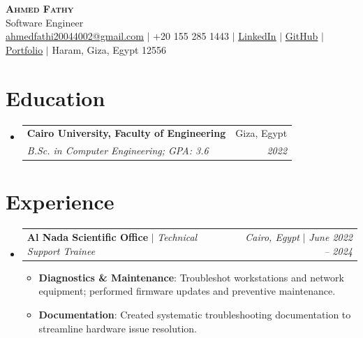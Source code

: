 \documentclass[letterpaper,11pt]{article}
\makeatletter
\newcommand{\resumeItem}[2]{\item\small{\textbf{#1}{: #2 \vspace{-2pt}}}}
\newcommand{\resumeSubheading}[4]{
  \vspace{-1pt}\item
    \begin{tabular*}{0.97\textwidth}{l@{\extracolsep{\fill}}r}
      \textbf{#1} & #2 \\
      \textit{\small#3} & \textit{\small #4} \\
    \end{tabular*}\vspace{-5pt}
}
\newcommand{\resumeActivitySubheading}[4]{
  \vspace{-1pt}\item
    \begin{tabular*}{0.97\textwidth}{l@{\extracolsep{\fill}}r}
      \textbf{#1} $|$ \textit{\small#3} & \textit{\small#2} $|$ \textit{\small #4} \\
    \end{tabular*}\vspace{-5pt}
}
\newcommand{\resumeSubHeadingListStart}{\begin{itemize}[leftmargin=*]}
\newcommand{\resumeSubHeadingListEnd}{\end{itemize}}
\newcommand{\resumeItemListStart}{\begin{itemize}}
\newcommand{\resumeItemListEnd}{\end{itemize}\vspace{-5pt}}
\makeatother
\begin{document}
\begin{center}
    \textbf{\Huge \scshape Ahmed Fathy} \\ \vspace{1pt}
    \small Software Engineer \\
    \href{mailto:ahmedfathi20044002@gmail.com}{\underline{ahmedfathi20044002@gmail.com}} $|$
    +20 155 285 1443 $|$
    \href{https://www.linkedin.com/in/ahmedfathy-x1}{\underline{LinkedIn}} $|$
    \href{https://github.com/ahmedfathy0-0}{\underline{GitHub}} $|$
    \href{https://www.mrfathi.tech/}{\underline{Portfolio}} $|$
    Haram, Giza, Egypt 12556
\end{center}


\section{Education}
  \resumeSubHeadingListStart
    \resumeSubheading
      {Cairo University, Faculty of Engineering}{Giza, Egypt}
      {B.Sc. in Computer Engineering;  GPA: 3.6}{2022}
  \resumeSubHeadingListEnd
\section{Experience}
  \resumeSubHeadingListStart
    \resumeActivitySubheading
      {Al Nada Scientific Office}{Cairo, Egypt}{Technical Support Trainee}{June 2022 -- 2024}
      \resumeItemListStart
        \resumeItem{Diagnostics \& Maintenance}
          {Troubleshot workstations and network equipment; performed firmware updates and preventive maintenance.}
        \resumeItem{Documentation}
          {Created systematic troubleshooting documentation to streamline hardware issue resolution.}
      \resumeItemListEnd
  \resumeSubHeadingListEnd
\end{document}

